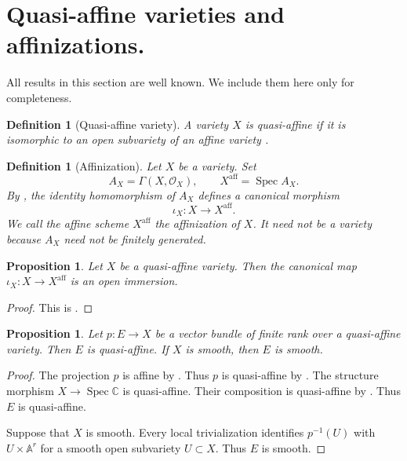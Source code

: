 \documentclass[10pt,a4paper]{amsart}
\newtheorem{proposition}[theorem]{Proposition}
\newtheorem{definition}[theorem]{Definition}
\DeclareMathOperator{\Spec}{Spec}
\newcommand{\C}{\mathbb C}
\newcommand{\OO}{\mathcal O}
\newcommand{\aff}{\mathrm{aff}}
\begin{document}
\section{Quasi-affine varieties and affinizations.}\label{quasiaffinesection}

All results in this section are well known. We include them here only for completeness.

\begin{definition}[Quasi-affine variety]\label{quasiaffinedefinition}
    A variety $X$ is \emph{quasi-affine} if it is isomorphic to an open subvariety of an affine variety \cite[Definition~28.19.1]{Stacks}.
\end{definition}

\begin{definition}[Affinization]\label{affinizationdefinition}
    Let $X$ be a variety. Set
    \[
        A_X=\Gamma(X,\OO_X),
        \qquad
        X^\aff=\Spec A_X.
    \]
    By \cite[Lemma~26.6.4]{Stacks}, the identity homomorphism of $A_X$ defines a canonical morphism
    \[
        \iota_X:X\longrightarrow X^\aff.
    \]
    We call the affine scheme $X^\aff$ the \emph{affinization} of $X$. It need not be a variety because $A_X$ need not be finitely generated.
\end{definition}

\begin{proposition}\label{affinizationmap}
    Let $X$ be a quasi-affine variety. Then the canonical map $\iota_X:X\to X^\aff$ is an open immersion.
\end{proposition}
\begin{proof}
    This is \cite[Lemma~28.19.4]{Stacks}.
\end{proof}

\begin{proposition}\label{vectorbundlequasiaffine}
    Let $p:E\to X$ be a vector bundle of finite rank over a quasi-affine variety. Then $E$ is quasi-affine. If $X$ is smooth, then $E$ is smooth.
\end{proposition}
\begin{proof}
    The projection $p$ is affine by \cite[Definition~27.6.2]{Stacks}. Thus $p$ is quasi-affine by \cite[Definition~29.13.1]{Stacks}. The structure morphism $X\to\Spec\C$ is quasi-affine. Their composition is quasi-affine by \cite[Lemma~29.13.4]{Stacks}. Thus $E$ is quasi-affine.

    Suppose that $X$ is smooth. Every local trivialization identifies $p^{-1}(U)$ with $U\times\mathbb A^r$ for a smooth open subvariety $U\subset X$. Thus $E$ is smooth.
\end{proof}
\end{document}
